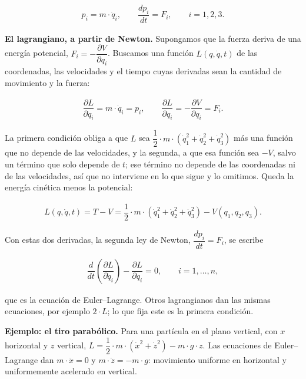 \documentclass[11pt,a4paper,spanish]{book}
\begin{document}
\[
\begin{aligned}
p_i = m \cdot \dot{q}_i, \qquad \dfrac{dp_i}{dt} = F_i, \qquad i = 1, 2, 3.
\end{aligned}
\]

\textbf{El lagrangiano, a partir de Newton.} Supongamos que la fuerza
deriva de una energía potencial,
\(F_i = -\dfrac{\partial V}{\partial q_i}\). Buscamos una función
\(L(q, \dot{q}, t)\) de las coordenadas, las velocidades y el tiempo
cuyas derivadas sean la cantidad de movimiento y la fuerza:

\[
\begin{aligned}
\dfrac{\partial L}{\partial \dot{q}_i} = m \cdot \dot{q}_i = p_i, \qquad \dfrac{\partial L}{\partial q_i} = -\dfrac{\partial V}{\partial q_i} = F_i.
\end{aligned}
\]

La primera condición obliga a que \(L\) sea
\(\dfrac{1}{2} \cdot m \cdot (\dot{q}_1^2 + \dot{q}_2^2 + \dot{q}_3^2)\)
más una función que no depende de las velocidades, y la segunda, a que
esa función sea \(-V\), salvo un término que solo depende de \(t\); ese
término no depende de las coordenadas ni de las velocidades, así que no
interviene en lo que sigue y lo omitimos. Queda la energía cinética
menos la potencial:

\[
\begin{aligned}
L(q, \dot{q}, t) = T - V = \dfrac{1}{2} \cdot m \cdot \left(\dot{q}_1^2 + \dot{q}_2^2 + \dot{q}_3^2\right) - V(q_1, q_2, q_3).
\end{aligned}
\]

Con estas dos derivadas, la segunda ley de Newton,
\(\dfrac{dp_i}{dt} = F_i\), se escribe

\[
\begin{aligned}
\dfrac{d}{dt}\left(\dfrac{\partial L}{\partial \dot{q}_i}\right) - \dfrac{\partial L}{\partial q_i} = 0, \qquad i = 1, \dots, n,
\end{aligned}
\]

que es la ecuación de Euler--Lagrange. Otros lagrangianos dan las mismas
ecuaciones, por ejemplo \(2 \cdot L\); lo que fija este es la primera
condición.

\textbf{Ejemplo: el tiro parabólico.} Para una partícula en el plano
vertical, con \(x\) horizontal y \(z\) vertical,
\(L = \dfrac{1}{2} \cdot m \cdot (\dot{x}^2 + \dot{z}^2) - m \cdot g \cdot z\).
Las ecuaciones de Euler--Lagrange dan \(m \cdot \ddot{x} = 0\) y
\(m \cdot \ddot{z} = -m \cdot g\): movimiento uniforme en horizontal y
uniformemente acelerado en vertical.
\end{document}
